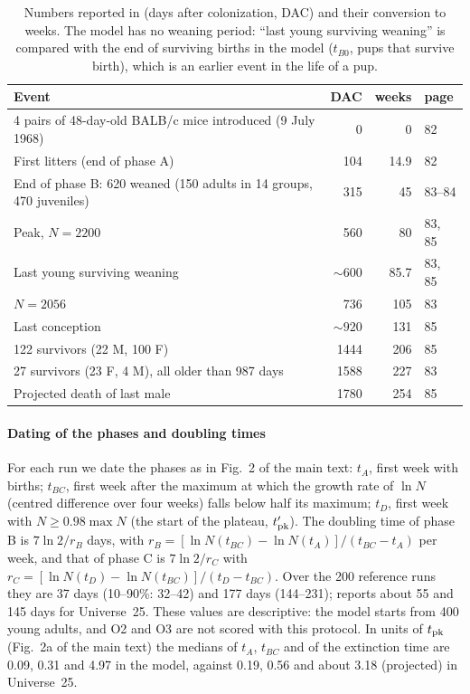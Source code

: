 \documentclass[preprint,12pt,authoryear]{elsarticle}
\begin{document}
\begin{table}[ht]
\centering\small
\caption{Numbers reported in \citep{Calhoun1973} (days after colonization, DAC) and their conversion to weeks.
The model has no weaning period: ``last young surviving weaning'' is compared with the end of surviving births in
the model ($t_{B0}$, pups that survive birth), which is an earlier event in the life of a pup.}
\label{tab:calhoun-numbers}
\begin{tabular}{@{}p{}rrl@{}}
\toprule
Event & DAC & weeks & page \\
\midrule
4 pairs of 48-day-old BALB/c mice introduced (9 July 1968) & 0 & 0 & 82 \\
First litters (end of phase A) & 104 & 14.9 & 82 \\
End of phase B: 620 weaned (150 adults in 14 groups, 470 juveniles) & 315 & 45 & 83--84 \\
Peak, $N=2200$ & 560 & 80 & 83, 85 \\
Last young surviving weaning & ${\sim}600$ & 85.7 & 83, 85 \\
$N=2056$ & 736 & 105 & 83 \\
Last conception & ${\sim}920$ & 131 & 85 \\
122 survivors (22 M, 100 F) & 1444 & 206 & 85 \\
27 survivors (23 F, 4 M), all older than 987 days & 1588 & 227 & 83 \\
Projected death of last male & 1780 & 254 & 85 \\
\bottomrule
\end{tabular}
\end{table}

\paragraph{Dating of the phases and doubling times}
For each run we date the phases as in Fig.~2 of the main text: $t_A$, first week with births; $t_{BC}$, first week
after the maximum at which the growth rate of $\ln N$ (centred difference over four weeks) falls below half its
maximum; $t_D$, first week with $N\ge0.98\max N$ (the start of the plateau, $t'_{\rm pk}$). The doubling time of
phase B is $7\ln2/r_B$ days, with $r_B=[\ln N(t_{BC})-\ln N(t_A)]/(t_{BC}-t_A)$ per week, and that of phase C is
$7\ln2/r_C$ with $r_C=[\ln N(t_D)-\ln N(t_{BC})]/(t_D-t_{BC})$. Over the 200 reference runs they are 37 days
(10--90\%: 32--42) and 177 days (144--231); \citet{Calhoun1973} reports about 55 and 145 days for Universe~25. These
values are descriptive: the model starts from 400 young adults, and O2 and O3 are not scored with this protocol. In
units of $t_{\rm pk}$ (Fig.~2a of the main text) the medians of $t_A$, $t_{BC}$ and of the extinction time are 0.09,
0.31 and 4.97 in the model, against 0.19, 0.56 and about 3.18 (projected) in Universe~25.
\end{document}
